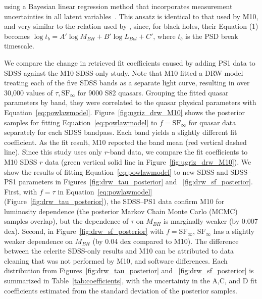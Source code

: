 \documentclass[twocolumn]{aastex62}
\newcommand{\project}[1]{\textsf{#1}}
\begin{document}
using a Bayesian linear regression method that incorporates measurement uncertainties in all latent variables~\citep{kelly2007b}. This ansatz is identical to that used by M10, and very similar to the relation used by \cite{scaringi2015}, since, for black holes, their Equation (1) becomes $\log{t_{b}} = A' \log{M_{BH}} + B' \log{L_{Bol}}+C'$, where $t_{b}$ is the PSD break timescale. 

We compare the change in retrieved fit coefficients caused by adding PS1 data to SDSS against the M10 SDSS-only study. Note that M10 fitted a DRW model treating each of the five SDSS bands as a separate light curve, resulting in over 30,000 values of $\tau, \mathrm{SF}_{\infty}$ for 9000 S82 quasars. Grouping the fitted quasar parameters by band, they were correlated to the quasar physical parameters with Equation~\ref{eq:powlawmodel}. Figure~\ref{fig:ugriz_drw_M10} shows the posterior samples for fitting  Equation~\ref{eq:powlawmodel} to $f=\mathrm{SF}_{\infty}$ for quasar data separately for each SDSS bandpass.  Each band yields a slightly different fit coefficient. As the fit result, M10 reported the band mean (red vertical dashed line). Since this study uses only $r$-band data, we compare the fit coefficients to M10 SDSS $r$ data (green vertical solid line in Figure~\ref{fig:ugriz_drw_M10}). We show the results of fitting Equation~\ref{eq:powlawmodel} to new SDSS and SDSS--PS1 parameters in Figures~\ref{fig:drw_tau_posterior} and ~\ref{fig:drw_sf_posterior}. First, with $f=\tau$ in Equation~\ref{eq:powlawmodel} (Figure~\ref{fig:drw_tau_posterior}), the SDSS--PS1 data confirm M10 for luminosity dependence (the posterior Markov Chain Monte Carlo (MCMC) samples overlap), but the dependence of $\tau$  on $M_{BH}$  is marginally weaker (by 0.007 dex). Second, in Figure~\ref{fig:drw_sf_posterior} with  $f=\mathrm{SF}_{\infty}$, $\mathrm{SF}_{\infty}$ has a slightly weaker dependence on $M_{BH}$ (by 0.04 dex compared to M10). The difference between the \project{celerite} SDSS-only results and M10 can be attributed to data cleaning that was not performed by M10, and software differences. Each distribution from Figures~\ref{fig:drw_tau_posterior} and ~\ref{fig:drw_sf_posterior} is summarized in Table~\ref{tab:coefficients}, with the uncertainty in the A,C, and D fit coefficients estimated from  the standard deviation of the posterior samples. 
\end{document}
